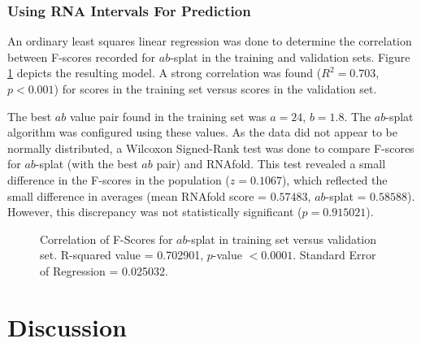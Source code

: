 \documentclass{cshonours}
\begin{document}
\subsection{Using RNA Intervals For Prediction}
\label{sec:res_absplat}
An ordinary least squares linear regression was done to determine the correlation between F-scores recorded for $ab$-splat in the training and validation sets. Figure \ref{fig:abcorrelation} depicts the resulting model. A strong correlation was found ($R^2 = 0.703$, $p < 0.001$) for scores in the training set versus scores in the validation set.

The best $ab$ value pair found in the training set was $a = 24$, $b = 1.8$. The $ab$-splat algorithm was configured using these values. As the data did not appear to be normally distributed, a Wilcoxon Signed-Rank test was done to compare F-scores for $ab$-splat (with the best $ab$ pair) and RNAfold. This test revealed a small difference in the F-scores in the population ($z = 0.1067$), which reflected the small difference in averages (mean RNAfold score = $0.57483$, $ab$-splat = $0.58588$). However, this discrepancy was not statistically significant ($p = 0.915021$).


\begin{figure}
\begin{center}
\end{center}
\caption{Correlation of F-Scores for $ab$-splat in training set versus validation set. R-squared value = 0.702901, $p$-value $< 0.0001$. Standard Error of Regression = 0.025032.}
\label{fig:abcorrelation}
\end{figure}

\chapter{Discussion}
\end{document}
